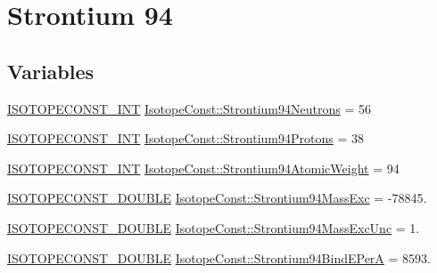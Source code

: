 \hypertarget{group___isotope_const-_strontium-_sr94}{}\section{Strontium 94}
\label{group___isotope_const-_strontium-_sr94}
\subsection*{Variables}
\begin{DoxyCompactItemize}
\item 
\mbox{\hyperlink{group___isotope_const-_macros_ga5f18360b3e99483a35c32d789e62621c}{I\+S\+O\+T\+O\+P\+E\+C\+O\+N\+S\+T\+\_\+\+I\+NT}} \mbox{\hyperlink{group___isotope_const-_strontium-_sr94_ga6340e1a605e84e2d3577f1f16425f737}{Isotope\+Const\+::\+Strontium94\+Neutrons}} = 56
\item 
\mbox{\hyperlink{group___isotope_const-_macros_ga5f18360b3e99483a35c32d789e62621c}{I\+S\+O\+T\+O\+P\+E\+C\+O\+N\+S\+T\+\_\+\+I\+NT}} \mbox{\hyperlink{group___isotope_const-_strontium-_sr94_gab2cd8ee4c4c819e8f72686067dec596e}{Isotope\+Const\+::\+Strontium94\+Protons}} = 38
\item 
\mbox{\hyperlink{group___isotope_const-_macros_ga5f18360b3e99483a35c32d789e62621c}{I\+S\+O\+T\+O\+P\+E\+C\+O\+N\+S\+T\+\_\+\+I\+NT}} \mbox{\hyperlink{group___isotope_const-_strontium-_sr94_ga711e65859bb8a7590d2b8e96fceef40b}{Isotope\+Const\+::\+Strontium94\+Atomic\+Weight}} = 94
\item 
\mbox{\hyperlink{group___isotope_const-_macros_ga8f45a7272ce02c0b4c65c44636ed719a}{I\+S\+O\+T\+O\+P\+E\+C\+O\+N\+S\+T\+\_\+\+D\+O\+U\+B\+LE}} \mbox{\hyperlink{group___isotope_const-_strontium-_sr94_gab89b02496bd6871b942fd2895833c54d}{Isotope\+Const\+::\+Strontium94\+Mass\+Exc}} = -\/78845.
\item 
\mbox{\hyperlink{group___isotope_const-_macros_ga8f45a7272ce02c0b4c65c44636ed719a}{I\+S\+O\+T\+O\+P\+E\+C\+O\+N\+S\+T\+\_\+\+D\+O\+U\+B\+LE}} \mbox{\hyperlink{group___isotope_const-_strontium-_sr94_ga76305d1f298f6e88b1bca3026f5dce94}{Isotope\+Const\+::\+Strontium94\+Mass\+Exc\+Unc}} = 1.
\item 
\mbox{\hyperlink{group___isotope_const-_macros_ga8f45a7272ce02c0b4c65c44636ed719a}{I\+S\+O\+T\+O\+P\+E\+C\+O\+N\+S\+T\+\_\+\+D\+O\+U\+B\+LE}} \mbox{\hyperlink{group___isotope_const-_strontium-_sr94_ga214525bab2cc7c5c6e8ddb99d806a42b}{Isotope\+Const\+::\+Strontium94\+Bind\+E\+PerA}} = 8593.
\item 

\end{DoxyCompactItemize}

